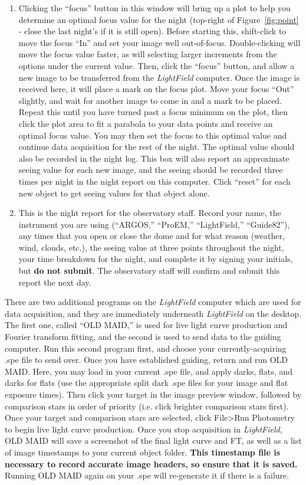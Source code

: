 \documentclass[12pt]{article}
\begin{document}
\begin{enumerate}
   \item Clicking the ``focus'' button in this window will bring up a plot to help you determine an optimal focus value for the night (top-right of Figure~\ref{fig:point} - close the last night's if it is still open). Before starting this, shift-click to move the focus ``In'' and set your image well out-of-focus. Double-clicking will move the focus value faster, as will selecting larger increments from the options under the current value. Then, click the ``focus'' button, and allow a new image to be transferred from the \textit{LightField} computer. Once the image is received here, it will place a mark on the focus plot. Move your focus ``Out'' slightly, and wait for another image to come in and a mark to be placed. Repeat this until you have turned past a focus minimum on the plot, then click the plot area to fit a parabola to your data points and receive an optimal focus value. You may then set the focus to this optimal value and continue data acquisition for the rest of the night. The optimal value should also be recorded in the night log. This box will also report an approximate seeing value for each new image, and the seeing should be recorded three times per night in the night report on this computer. Click ``reset'' for each new object to get seeing values for that object alone.
   \item This is the night report for the observatory staff. Record your name, the instrument you are using (``ARGOS,'' ``ProEM,'' ``LightField,'' ``Guide82''), any times that you open or close the dome and for what reason (weather, wind, clouds, etc.), the seeing value at three points throughout the night, your time breakdown for the night, and complete it by signing your initials, but \textbf{do not submit}. The observatory staff will confirm and submit this report the next day.
\end{enumerate}

There are two additional programs on the \textit{LightField} computer which are used for data acquisition, and they are immediately underneath \textit{LightField} on the desktop. The first one, called ``OLD MAID,'' is used for live light curve production and Fourier transform fitting, and the second is used to send data to the guiding computer. Run this second program first, and choose your currently-acquiring .spe file to send over. Once you have established guiding, return and run OLD MAID. Here, you may load in your current .spe file, and apply darks, flats, and darks for flats (use the appropriate split dark .spe files for your image and flat exposure times). Then click your target in the image preview window, followed by comparison stars in order of priority (i.e. click brighter comparison stars first). Once your target and comparison stars are selected, click File\textgreater Run Photometry to begin live light curve production. Once you stop acquisition in \textit{LightField}, OLD MAID will save a screenshot of the final light curve and FT, as well as a list of image timestamps to your current object folder. \textbf{This timestamp file is necessary to record accurate image headers, so ensure that it is saved.} Running OLD MAID again on your .spe will re-generate it if there is a failure.
\end{document}
